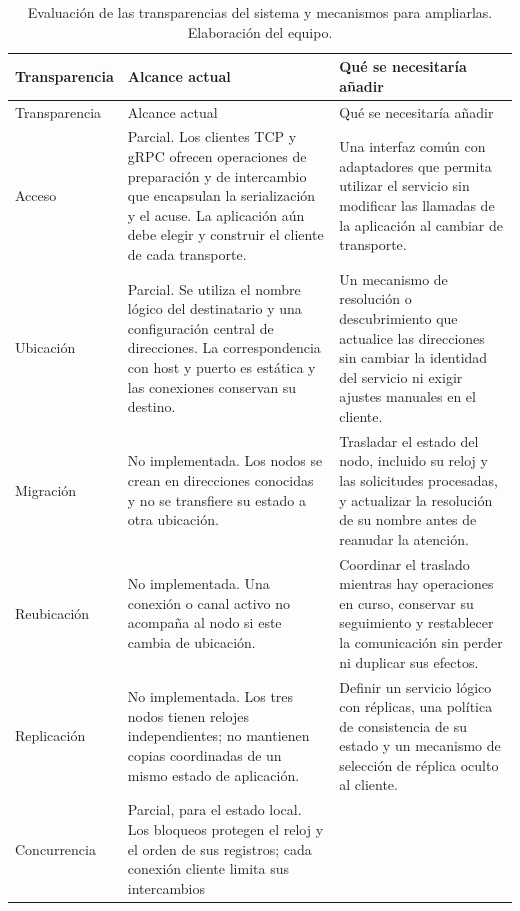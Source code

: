 \begingroup
\small
\renewcommand{\arraystretch}{1.15}
\renewcommand{\tablename}{Tabla}
\setlength{\LTcapwidth}{\linewidth}
\begin{longtable}{@{}>{\raggedright\arraybackslash}p{2.5cm}>{\raggedright\arraybackslash}p{5.4cm}>{\raggedright\arraybackslash}p{7.1cm}@{}}
\caption{Evaluación de las transparencias del sistema y mecanismos para ampliarlas. Elaboración del equipo.}
\label{tab:ansa-implementacion}\\
\toprule
Transparencia & Alcance actual & Qué se necesitaría añadir \\
\midrule
\endfirsthead
\toprule
Transparencia & Alcance actual & Qué se necesitaría añadir \\
\midrule
\endhead
Acceso & Parcial. Los clientes TCP y gRPC ofrecen operaciones de preparación
y de intercambio que encapsulan la serialización y el acuse. La aplicación aún
debe elegir y construir el cliente de cada transporte.
& Una interfaz común con adaptadores que permita utilizar el servicio sin
modificar las llamadas de la aplicación al cambiar de transporte. \\
Ubicación & Parcial. Se utiliza el nombre lógico del destinatario y una
configuración central de direcciones. La correspondencia con host y puerto es
estática y las conexiones conservan su destino.
& Un mecanismo de resolución o descubrimiento que actualice las direcciones
sin cambiar la identidad del servicio ni exigir ajustes manuales en el cliente. \\
Migración & No implementada. Los nodos se crean en direcciones conocidas y no
se transfiere su estado a otra ubicación.
& Trasladar el estado del nodo, incluido su reloj y las solicitudes procesadas,
y actualizar la resolución de su nombre antes de reanudar la atención. \\
Reubicación & No implementada. Una conexión o canal activo no acompaña al nodo
si este cambia de ubicación.
& Coordinar el traslado mientras hay operaciones en curso, conservar su
seguimiento y restablecer la comunicación sin perder ni duplicar sus efectos. \\
Replicación & No implementada. Los tres nodos tienen relojes independientes;
no mantienen copias coordinadas de un mismo estado de aplicación.
& Definir un servicio lógico con réplicas, una política de consistencia de su
estado y un mecanismo de selección de réplica oculto al cliente. \\
Concurrencia & Parcial, para el estado local. Los bloqueos protegen el reloj
y el orden de sus registros; cada conexión cliente limita sus intercambios

\end{longtable}
